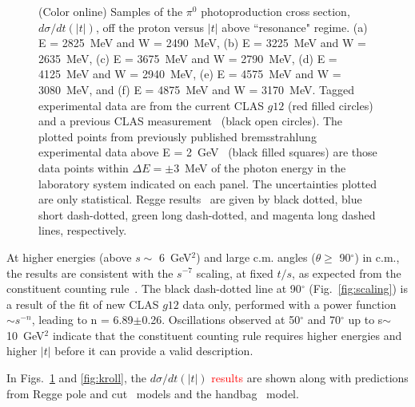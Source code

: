 \documentclass[aps,prc,twocolumn,floatfix,showpacs,preprintnumbers,amsmath,amssymb,superscriptaddress,linenumbers]{revtex4-1}
\begin{document}
\begin{figure}[htb!]
        \caption {(Color online) Samples of the $\pi^0$ photoproduction 
	cross section, $d\sigma/dt(|t|)$, off the proton versus $|t|$ 
	above ``resonance" regime.  
	(a) E = 2825~MeV and W = 2490~MeV, 
	(b) E = 3225~MeV and W = 2635~MeV,
	(c) E = 3675~MeV and W = 2790~MeV, 
	(d) E = 4125~MeV and W = 2940~MeV,
	(e) E = 4575~MeV and W = 3080~MeV, and
	(f) E = 4875~MeV and W = 3170~MeV.
	Tagged experimental data are from the current CLAS $g12$ (red 
	filled circles) and a previous CLAS 
	measurement~\protect\cite{Dugger:2007bt} (black open circles). 
	The plotted points from previously published bremsstrahlung 
	experimental data above E = 2~GeV~\protect\cite{brem} (black 
	filled squares) are those data points within $\Delta E = 
	\pm$3~MeV of the photon energy in the laboratory system 
	indicated on each panel. The uncertainties plotted are only 
	statistical. 
	Regge results~\protect\cite{Goldstein:1973xn,Laget:2005be,
	Mathieu:2015eia,Donnachie:2015jaa} are given by black dotted, 
	blue short dash-dotted, green long dash-dotted, and magenta 
	long dashed lines, respectively.} 
	\label{fig:t_data}
\end{figure}


At higher energies (above $s\sim$ 6~GeV$^2$) and large c.m. angles 
($\theta\geq$ 90$^\circ$) in c.m., the results are consistent with 
the $s^{-7}$ scaling, at fixed $t/s$, as expected from the 
constituent counting rule~\cite{Brodsky:1973kr}. 
The black dash-dotted line at 90$^\circ$ (Fig.~\ref{fig:scaling}) 
is a result of the fit of new CLAS $g12$ data only, performed with a 
power function $\sim s^{-n}$, leading to n = 6.89$\pm$0.26.  
Oscillations observed at 50$^\circ$ and 70$^\circ$ up to 
s$\sim$10~GeV$^2$ indicate that the constituent 
counting rule requires higher energies and higher $|t|$ before it 
can provide a valid description.


In Figs.~\ref{fig:t_data} and \ref{fig:kroll}, the 
$d\sigma/dt(|t|)$ \textcolor{red}{results} are shown along with predictions from 
Regge pole and cut~\cite{Goldstein:1973xn,Laget:2005be,
Mathieu:2015eia,Donnachie:2015jaa} models and the 
handbag~\cite{Huang:2000kd} model. 
\end{document}
